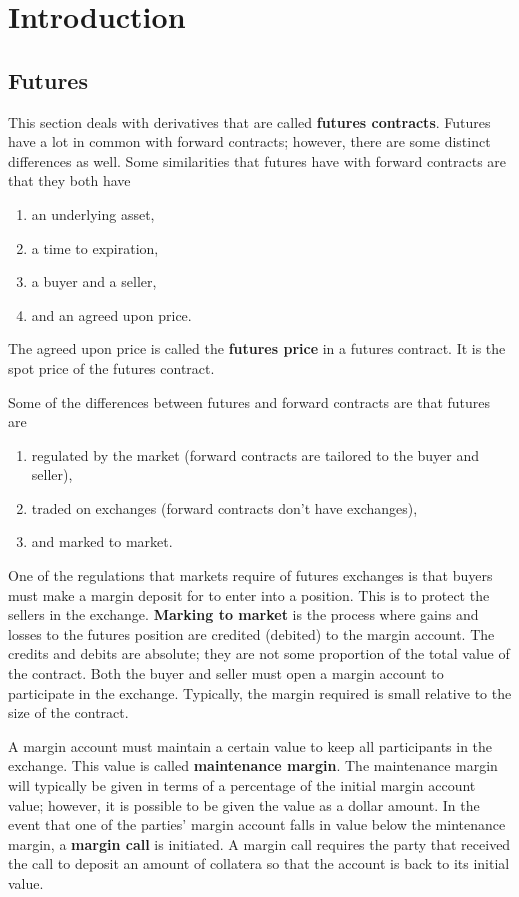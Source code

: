 \documentclass{ximera}
\begin{document}
\chapter{Introduction}

\section{Futures}

This section deals with derivatives that are called {\bf futures contracts}. Futures have a lot in common with forward contracts; however, there are some distinct differences as well. Some similarities that futures have with forward contracts are that they both have
\begin{enumerate}
\item an underlying asset,
\item a time to expiration,
\item a buyer and a seller,
\item and an agreed upon price.
\end{enumerate} 
The agreed upon price is called the {\bf futures price} in a futures contract. It is the spot price of the futures contract.

Some of the differences between futures and forward contracts are that futures are
\begin{enumerate}
\item regulated by the market (forward contracts are tailored to the buyer and seller),
\item traded on exchanges (forward contracts don't have exchanges),
\item and marked to market.
\end{enumerate}
One of the regulations that markets require of futures exchanges is that buyers must make a margin deposit for to enter into a position. This is to protect the sellers in the exchange. {\bf Marking to market} is the process where gains and losses to the futures position are credited (debited) to the margin account. The credits and debits are absolute; they are not some proportion of the total value of the contract. Both the buyer and seller must open a margin account to participate in the exchange. Typically, the margin required is small relative to the size of the contract.

A margin account must maintain a certain value to keep all participants in the exchange. This value is called {\bf maintenance margin}. The maintenance margin will typically be given in terms of a percentage of the initial margin account value; however, it is possible to be given the value as a dollar amount. In the event that one of the parties' margin account falls in value below the mintenance margin, a {\bf margin call} is initiated. A margin call requires the party that received the call to deposit an amount of collatera so that the account is back to its initial value. 
\end{document}
